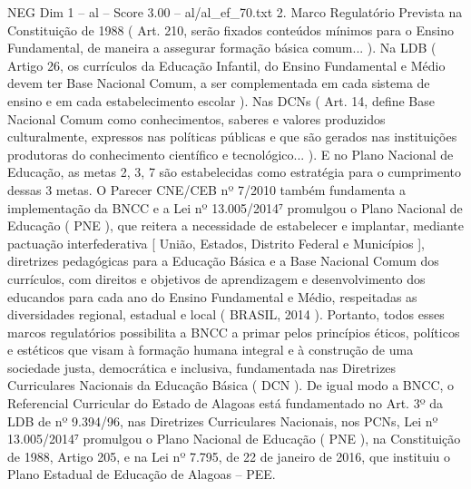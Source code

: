 \begin{textsample}{NEG Dim 1 – al – Score 3.00 – al/al\_ef\_70.txt}  \label{ex:f1_neg_132}
2.
Marco Regulatório Prevista na Constituição de 1988 ( Art. 210, serão fixados conteúdos mínimos para o Ensino Fundamental, de maneira a assegurar formação básica comum... ).
Na LDB ( Artigo 26, os currículos da Educação Infantil, do Ensino Fundamental e Médio devem ter Base Nacional Comum, a ser complementada em cada sistema de ensino e em cada estabelecimento escolar ).
Nas DCNs ( Art. 14, define Base Nacional Comum como conhecimentos, saberes e valores produzidos culturalmente, expressos nas políticas públicas e que são gerados nas instituições produtoras do conhecimento científico e tecnológico... ).
E no Plano Nacional de Educação, as metas 2, 3, 7 são estabelecidas como estratégia para o cumprimento dessas 3 metas.
O Parecer CNE/CEB nº 7/2010 também fundamenta a implementação da BNCC e a Lei nº 13.005/2014⁷ promulgou o Plano Nacional de Educação ( PNE ), que reitera a necessidade de estabelecer e implantar, mediante pactuação interfederativa [ União, Estados, Distrito Federal e Municípios ], diretrizes pedagógicas para a Educação Básica e a Base Nacional Comum dos currículos, com direitos e objetivos de aprendizagem e desenvolvimento dos educandos para cada ano do Ensino Fundamental e Médio, respeitadas as diversidades regional, estadual e local ( BRASIL, 2014 ).
Portanto, todos esses marcos regulatórios possibilita a BNCC a primar pelos princípios éticos, políticos e estéticos que visam à formação humana integral e à construção de uma sociedade justa, democrática e inclusiva, fundamentada nas Diretrizes Curriculares Nacionais da Educação Básica ( DCN ).
De igual modo a BNCC, o Referencial Curricular do Estado de Alagoas está fundamentado no Art. 3º da LDB de nº 9.394/96, nas Diretrizes Curriculares Nacionais, nos PCNs, Lei nº 13.005/2014⁷ promulgou o Plano Nacional de Educação ( PNE ), na Constituição de 1988, Artigo 205, e na Lei nº 7.795, de 22 de janeiro de 2016, que instituiu o Plano Estadual de Educação de Alagoas – PEE.

\end{textsample}
